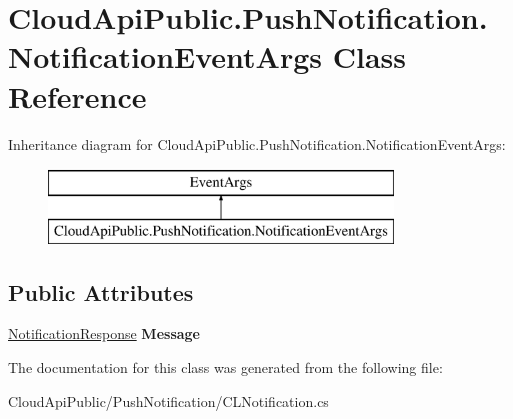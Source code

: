 \hypertarget{class_cloud_api_public_1_1_push_notification_1_1_notification_event_args}{\section{Cloud\-Api\-Public.\-Push\-Notification.\-Notification\-Event\-Args Class Reference}
\label{class_cloud_api_public_1_1_push_notification_1_1_notification_event_args}
}
Inheritance diagram for Cloud\-Api\-Public.\-Push\-Notification.\-Notification\-Event\-Args\-:\begin{figure}[H]
\begin{center}
\leavevmode
\includegraphics[height=2.000000cm]{class_cloud_api_public_1_1_push_notification_1_1_notification_event_args}
\end{center}
\end{figure}
\subsection*{Public Attributes}
\begin{DoxyCompactItemize}
\item 
\hypertarget{class_cloud_api_public_1_1_push_notification_1_1_notification_event_args_ab25aa958a00ff490f2df678f917ace73}{\hyperlink{class_cloud_api_public_1_1_json_contracts_1_1_notification_response}{Notification\-Response} {\bfseries Message}}\label{class_cloud_api_public_1_1_push_notification_1_1_notification_event_args_ab25aa958a00ff490f2df678f917ace73}

\end{DoxyCompactItemize}


The documentation for this class was generated from the following file\-:\begin{DoxyCompactItemize}
\item 
Cloud\-Api\-Public/\-Push\-Notification/C\-L\-Notification.\-cs\end{DoxyCompactItemize}
